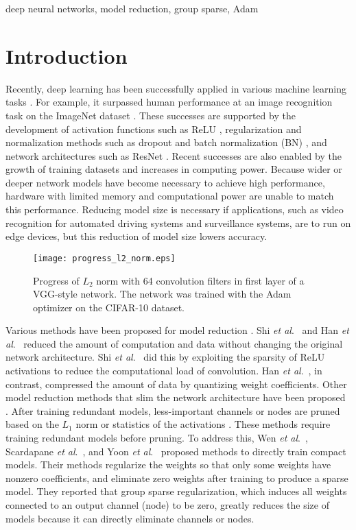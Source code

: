 \documentclass[conference]{IEEEtran}
\newcommand{\etal}{\textit{et al}.}
\begin{document}
\begin{IEEEkeywords}
deep neural networks, model reduction, group sparse, Adam
\end{IEEEkeywords}

\section{Introduction}\label{sec:introduction}
Recently, deep learning has been successfully applied in various machine learning tasks \cite{LeCun_2015}. 
For example, it surpassed human performance at an image recognition task on the ImageNet dataset \cite{He_2015}. 
These successes are supported by the development of activation functions such as ReLU \cite{Glorot_2011}, 
regularization and normalization methods such as dropout \cite{Srivastava_2014} and batch normalization (BN) \cite{Ioffe_2015}, and network architectures such as ResNet \cite{He_2016}. 
Recent successes are also enabled by the growth of training datasets and increases in computing power. 
Because wider or deeper network models have become necessary to achieve high performance, 
hardware with limited memory and computational power are unable to match this performance. 
Reducing model size is necessary if applications, such as video recognition for automated driving systems and surveillance systems, are to run on edge devices, 
but this reduction of model size lowers accuracy. 

\begin{figure}[!t] 
	\centerline{\texttt{[image: progress\_l2\_norm.eps]}}
	\caption{
		Progress of $L_2$ norm with 64 convolution filters in first layer of a VGG-style network. 
		The network was trained with the Adam optimizer on the CIFAR-10 dataset.
	}
	\label{fig:progress_l2_norm}
\end{figure}

Various methods have been proposed for model reduction \cite{Shi_2017,Han_2016,Li_2017,Polyak_2015,Wen_2016,Scardapane_2017,Yoon_2017}. 
Shi \etal~\cite{Shi_2017} and Han \etal~\cite{Han_2016} reduced the amount of computation and data without changing the original network architecture. 
Shi \etal~\cite{Shi_2017} did this by exploiting the sparsity of ReLU activations to reduce the computational load of convolution. 
Han \etal~\cite{Han_2016}, in contrast, compressed the amount of data by quantizing weight coefficients. 
Other model reduction methods that slim the network architecture have been proposed \cite{Li_2017,Polyak_2015,Wen_2016,Scardapane_2017}. 
After training redundant models, less-important channels or nodes are pruned based on the $L_1$ norm \cite{Li_2017} or statistics of the activations \cite{Polyak_2015}. 
These methods require training redundant models before pruning. To address this, Wen \etal~\cite{Wen_2016}, Scardapane \etal~\cite{Scardapane_2017}, and Yoon \etal~\cite{Yoon_2017} proposed methods to directly train compact models. 
Their methods regularize the weights so that only some weights have nonzero coefficients, and eliminate zero weights after training to produce a sparse model. 
They reported that group sparse regularization, which induces all weights connected to an output channel (node) to be zero, 
greatly reduces the size of models because it can directly eliminate channels or nodes. 
\end{document}
